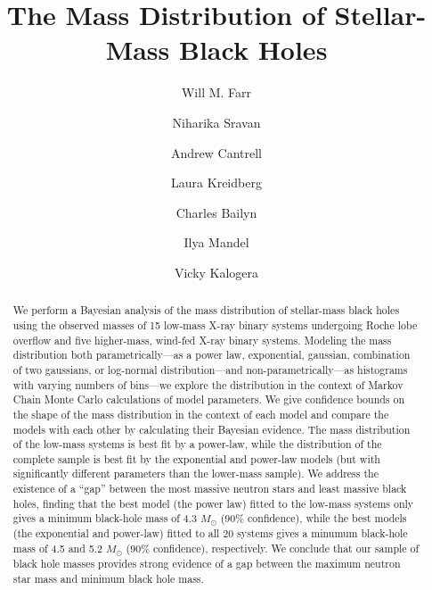 \documentclass[preprint]{aastex}
\newcommand{\Msun}{M_\odot}
\begin{document}
\title{The Mass Distribution of Stellar-Mass Black Holes}

\author{Will M. Farr \and Niharika Sravan} 



\author{Andrew Cantrell \and Laura Kreidberg \and Charles Bailyn}



\author{Ilya Mandel \and Vicky Kalogera} 



\begin{abstract}
  We perform a Bayesian analysis of the mass distribution of
  stellar-mass black holes using the observed masses of 15 low-mass
  X-ray binary systems undergoing Roche lobe overflow and five
  higher-mass, wind-fed X-ray binary systems.  Modeling the mass
  distribution both parametrically---as a power law, exponential,
  gaussian, combination of two gaussians, or log-normal
  distribution---and non-parametrically---as histograms with varying
  numbers of bins---we explore the distribution in the context of
  Markov Chain Monte Carlo calculations of model parameters.  We give
  confidence bounds on the shape of the mass distribution in the
  context of each model and compare the models with each other by
  calculating their Bayesian evidence.  The mass distribution of the
  low-mass systems is best fit by a power-law, while the distribution
  of the complete sample is best fit by the exponential and power-law
  models (but with significantly different parameters than the
  lower-mass sample).  We address the existence of a ``gap'' between
  the most massive neutron stars and least massive black holes,
  finding that the best model (the power law) fitted to the low-mass
  systems only gives a minimum black-hole mass of 4.3 $\Msun$ (90\%
  confidence), while the best models (the exponential and power-law)
  fitted to all 20 systems gives a minumum black-hole mass of 4.5 and
  5.2 $\Msun$ (90\% confidence), respectively.  We conclude that our
  sample of black hole masses provides strong evidence of a gap
  between the maximum neutron star mass and minimum black hole mass.
\end{abstract}
\end{document}

